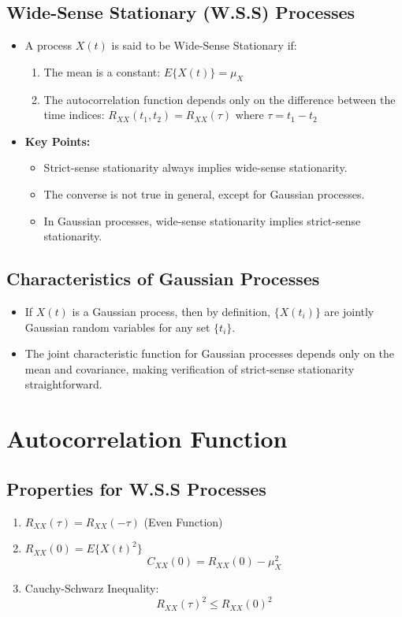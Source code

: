 \documentclass[12pt]{article}
\begin{document}
\subsection{Wide-Sense Stationary (W.S.S) Processes}
\begin{itemize}
    \item A process \( X(t) \) is said to be Wide-Sense Stationary if:
    \begin{enumerate}[label=(i)]
        \item The mean is a constant: \( E\{X(t)\} = \mu_X \)
        \item The autocorrelation function depends only on the difference between the time indices: \( R_{XX}(t_1, t_2) = R_{XX}(\tau) \) where \( \tau = t_1 - t_2 \)
    \end{enumerate}
    \item \textbf{Key Points:}
    \begin{itemize}
        \item Strict-sense stationarity always implies wide-sense stationarity.
        \item The converse is not true in general, except for Gaussian processes.
        \item In Gaussian processes, wide-sense stationarity implies strict-sense stationarity.
    \end{itemize}
\end{itemize}

\subsection{Characteristics of Gaussian Processes}
\begin{itemize}
    \item If \( X(t) \) is a Gaussian process, then by definition, \( \{X(t_i)\} \) are jointly Gaussian random variables for any set \( \{t_i\} \).
    \item The joint characteristic function for Gaussian processes depends only on the mean and covariance, making verification of strict-sense stationarity straightforward.
\end{itemize}

\section{Autocorrelation Function}
\subsection{Properties for W.S.S Processes}
\begin{enumerate}[label=(\arabic*)]
    \item \( R_{XX}(\tau) = R_{XX}(-\tau) \) \hfill (Even Function)
    \item \( R_{XX}(0) = E\{X(t)^2\} \)
    \[
    C_{XX}(0) = R_{XX}(0) - \mu_X^2
    \]
    \item Cauchy-Schwarz Inequality:
    \[
    R_{XX}(\tau)^2 \leq R_{XX}(0)^2
    \]
\end{enumerate}
\end{document}
